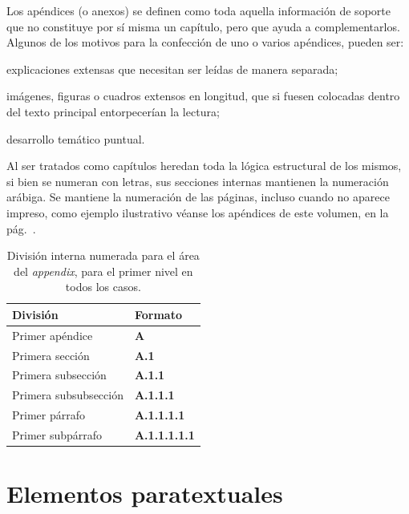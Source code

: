 \documentclass{book}
\begin{document}
{{{{{{{{{{{{{{{{{Los apéndices (o anexos) se definen como toda aquella información de soporte que no constituye por sí misma un capítulo, pero que ayuda a complementarlos. Algunos de los motivos para la confección de uno o varios apéndices, pueden ser:

\begin{compactenum}
\item explicaciones extensas que necesitan ser leídas de manera separada;
\item imágenes, figuras o cuadros extensos en longitud, que si fuesen colocadas dentro del texto principal entorpecerían la lectura;
\item desarrollo temático puntual.
\end{compactenum}

Al ser tratados como capítulos heredan toda la lógica estructural de los mismos, si bien se numeran con letras, sus secciones internas mantienen la numeración arábiga. Se mantiene la numeración de las páginas, incluso cuando no aparece impreso, como ejemplo ilustrativo véanse los apéndices de este volumen, en la pág.~\pageref{pro-edit}.

\begin{table}[!ht]\cuadrosTTT
\begin{mdframed}[linewidth=.5pt,linecolor=black!30,roundcorner=3pt,backgroundcolor=yellow!15]
\centering
\begin{tabular}{m{4cm} | m{4cm}}
\toprule
\textbf{División} & \textbf{Formato} \\
\midrule
Primer apéndice & \textbf{A}\\
\midrule
Primera sección & \textbf{A.1} \\
\midrule
Primera subsección & \textbf{A.1.1}\\
\midrule
Primera subsubsección & \textbf{A.1.1.1} \\
\midrule
Primer párrafo & \textbf{A.1.1.1.1}\\
\midrule
Primer subpárrafo & \textbf{A.1.1.1.1.1}\\
\bottomrule
\end{tabular}
\caption{División interna numerada para el área del \emph{appendix}, para el primer nivel en todos los casos.}
\end{mdframed}
\end{table}

\chapter{Elementos paratextuales}

}}}}}}}}}}}}}}}}}
\end{document}
